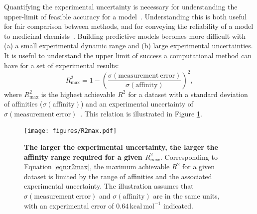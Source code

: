 \documentclass[9pt,bestpractices,pubversion]{livecoms}
\begin{document}
Quantifying the experimental uncertainty is necessary for understanding the upper-limit of feasible accuracy for a model~\cite{brown2009healthy}. Understanding this is both useful for fair comparison between methods, and for conveying the reliability of a model to medicinal chemists~\cite{griffen2020chemists}. Building predictive models becomes more difficult with (a) a small experimental dynamic range and (b) large experimental uncertainties. It is useful to understand the upper limit of success a computational method can have for a set of experimental results:
%
\begin{equation}\label{eqn:r2max}
    R^2_{\mathrm{max}} = 1 - \left(\frac{\sigma(\mathrm{measurement\   error})}{\sigma({\mathrm{affinity}})}\right) ^2,
\end{equation}
%
where $R^2_{\mathrm{max}}$ is the highest achievable $R^2$ for a dataset with a standard deviation of affinities ($\sigma(\mathrm{affinity})$) and an experimental uncertainty of  $\sigma\mathrm{(measurement\ error)}$~\cite{sheridan2020experimental}. This relation is illustrated in Figure \ref{fig:r2max}.

\begin{figure}[!ht]
    \texttt{[image: figures/R2max.pdf]}
    \caption{\textbf{The larger the experimental uncertainty, the larger the affinity range required for a given $R^2_{max}$}. Corresponding to Equation \ref{eqn:r2max}, the maximum achievable $R^2$ for a given dataset is limited by the range of affinities and the associated experimental uncertainty. The illustration assumes that $\sigma(\mathrm{measurement\ error})$ and $\sigma(\mathrm{affinity})$ are in the same units, with an experimental error of $0.64\,\mathrm{kcal\,mol^{-1}}$ indicated.}
    \label{fig:r2max}
\end{figure}
\end{document}
